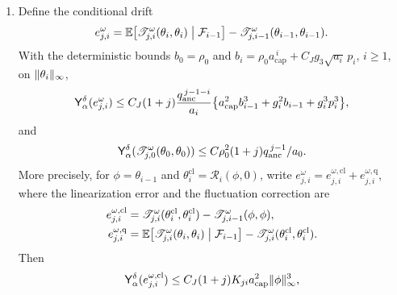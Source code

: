\begin{theorem}
\begin{enumerate}
\begin{align*}
 (\mathsf R_2+\mathsf C_2)(\mathscr T_{j,i}^\omega(t))&\le CK_{ji}\log(1+t/H^2),\\
 (\mathsf R_2+\mathsf C_2)(D_\delta\mathscr T_{j,i}^\omega(t))&\le CK_{ji}J_H(t).
\end{align*}
With the weights of $\Ynorm{\alpha}{\delta}$, that is, after multiplying the first bound by $(t+\delta^2)^\beta$ and the second by $(t+\delta^2)^\alpha$, the supremum over $t\le T$ of these coefficient norms is therefore at most $C_{L,T,\alpha,a_0}(1+j)K_{ji}$; we call this the weighted coefficient bound. On the whole cutoff domain $\Omega_i$ we also have, for $r=0,1,2,3$,
\[
 \sup_{w_i,x}\norm{D_{w_i}D_\delta^r\mathscr T_{j,i}^\omega(t,x)}_2\le C_{J,r}C_{\mathrm{CP}}^{\,2m}g_ib_iG^{-2}\,tH^{-1-r},
\]
and, for $r=0,1$,
\[
 \sup_{w_i,x}\norm{D_{w_i}\partial_tD_\delta^r\mathscr T_{j,i}^\omega(t,x)}_2\le C_{J,r}C_{\mathrm{CP}}^{\,2m}g_ib_iG^{-2}(H^{-1-r}+tH^{-3-r}).
\]
These bounds keep the factor $g_ib_i$, for later use in coverings.
\item Define the conditional drift
\[
 e_{j,i}^\omega=\mathbb E\bigl[\mathscr T_{j,i}^\omega(\theta_i,\theta_i)\bigm|\mathcal F_{i-1}\bigr]-\mathscr T_{j,i-1}^\omega(\theta_{i-1},\theta_{i-1}).
\]
With the deterministic bounds $b_0=\rho_0$ and $b_i=\rho_0a_{\mathrm{cap}}^{\,i}+C_Jg_3\sqrt{a_i}\,p_i$, $i\ge1$, on $\lVert \theta_i\rVert_\infty$,
\[
 \mathsf Y_{\alpha}^{\delta}(e_{j,i}^\omega)\le C_J(1+j)\frac{q_{\mathrm{anc}}^{\,j-1-i}}{a_i}\bigl\{a_{\mathrm{cap}}^2b_{i-1}^3+g_i^2b_{i-1}+g_i^3p_i^3\bigr\},
\]
and
\[
 \mathsf Y_{\alpha}^{\delta}(\mathscr T_{j,0}^\omega(\theta_0,\theta_0))\le C\rho_0^2(1+j)q_{\mathrm{anc}}^{\,j-1}/a_0.
\]
More precisely, for $\phi=\theta_{i-1}$ and $\theta_i^{\mathrm{cl}}=\mathscr R_i(\phi,0)$, write $e_{j,i}^\omega=e_{j,i}^{\omega,\mathrm{cl}}+e_{j,i}^{\omega,\mathrm q}$, where the linearization error and the fluctuation correction are
\begin{align*}
 e_{j,i}^{\omega,\mathrm{cl}}&=\mathscr T_{j,i}^\omega(\theta_i^{\mathrm{cl}},\theta_i^{\mathrm{cl}})-\mathscr T_{j,i-1}^\omega(\phi,\phi),\\
 e_{j,i}^{\omega,\mathrm q}&=\mathbb E\bigl[\mathscr T_{j,i}^\omega(\theta_i,\theta_i)\bigm|\mathcal F_{i-1}\bigr]-\mathscr T_{j,i}^\omega(\theta_i^{\mathrm{cl}},\theta_i^{\mathrm{cl}}).
\end{align*}
Then
\begin{align*}
 \Ynorm{\alpha}{\delta}(e_{j,i}^{\omega,\mathrm{cl}})&\le C_J(1+j)K_{ji}a_{\mathrm{cap}}^2\norm\phi_\infty^3,\\

\end{align*}
\end{enumerate}
\end{theorem}

